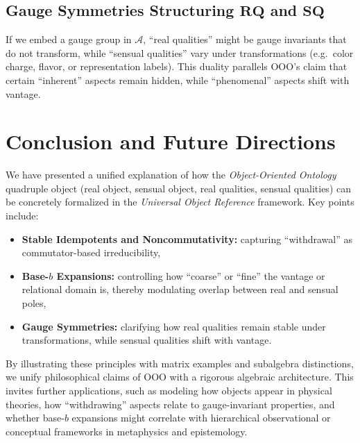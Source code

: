 \documentclass[11pt]{article}
\begin{document}
\subsection{Gauge Symmetries Structuring \texorpdfstring{\(\mathbf{RQ}\)}{RQ} and \texorpdfstring{\(\mathbf{SQ}\)}{SQ}
}
If we embed a gauge group in $\mathcal{A}$, “real qualities” might be gauge invariants 
that do not transform, while “sensual qualities” vary under transformations 
(e.g.\ color charge, flavor, or representation labels). This duality parallels 
OOO’s claim that certain “inherent” aspects remain hidden, 
while “phenomenal” aspects shift with vantage.


\section{Conclusion and Future Directions}

We have presented a unified explanation of how the \emph{Object-Oriented Ontology} 
quadruple object (real object, sensual object, real qualities, sensual qualities) 
can be concretely formalized in the \emph{Universal Object Reference} framework. 
Key points include:
\begin{itemize}[itemsep=0pt]
\item \textbf{Stable Idempotents and Noncommutativity:} 
  capturing “withdrawal” as commutator-based irreducibility,
\item \textbf{Base-$b$ Expansions:} 
  controlling how “coarse” or “fine” the vantage or relational domain is, 
  thereby modulating overlap between real and sensual poles,
\item \textbf{Gauge Symmetries:} 
  clarifying how real qualities remain stable under transformations, 
  while sensual qualities shift with vantage.

\end{itemize}
By illustrating these principles with matrix examples and subalgebra distinctions, 
we unify philosophical claims of OOO with a rigorous algebraic architecture. 
This invites further applications, such as modeling how objects appear in 
physical theories, how “withdrawing” aspects relate to gauge-invariant properties, 
and whether base-$b$ expansions might correlate with hierarchical observational 
or conceptual frameworks in metaphysics and epistemology.

\bigskip
\end{document}
